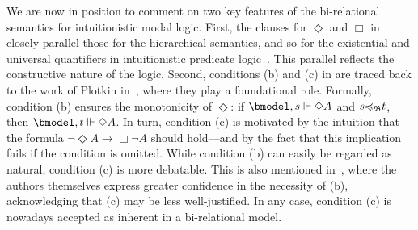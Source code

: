 
We are now in position to comment on two key features of the bi-relational semantics for intuitionistic modal logic.
First, the clauses for $\Diamond$ and $\Box$ in  closely parallel those for the hierarchical semantics, and so for the existential and universal quantifiers in intuitionistic predicate logic~\cite{Troelstra1988}. This parallel reflects the constructive nature of the logic. Second,    conditions (b) and (c) in  are traced back to the work of Plotkin in~\cite{PlotkinS86}, where they play a foundational role. Formally, condition (b) ensures the monotonicity of $\Diamond$: if $\bforces s {\Diamond A}$ and $s {\preccurlyeq_{\mathfrak{B}}} t$, then $\bforces t {\Diamond A}$. In turn, condition (c) is motivated by the intuition that the formula $\lnot \Diamond A \to \Box \lnot A$ should hold---and by the fact that this implication fails if the condition is omitted.
While condition (b) can easily be regarded as natural, condition (c) is more debatable. This is also mentioned in~\cite{PlotkinS86,simpson1994}, where the authors themselves express greater confidence in the necessity of (b), acknowledging that (c) may be less well-justified.
In any case, condition (c) is nowadays accepted as inherent in a bi-relational model.

